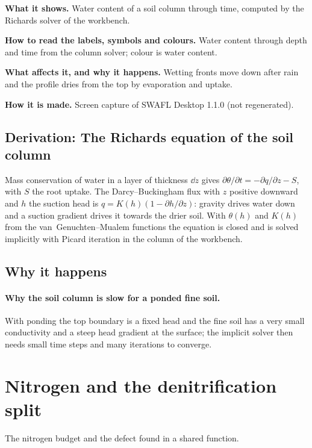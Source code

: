 \textbf{What it shows.} Water content of a soil column through time, computed by the Richards solver of the workbench.

\textbf{How to read the labels, symbols and colours.} Water content through depth and time from the column solver; colour is water content.

\textbf{What affects it, and why it happens.} Wetting fronts move down after rain and the profile dries from the top by evaporation and uptake.

\textbf{How it is made.} Screen capture of SWAFL Desktop 1.1.0 (not regenerated).


\subsection{Derivation: The Richards equation of the soil column}\label{der:s3:4}
Mass conservation of water in a layer of thickness $\dd z$ gives $\partial\theta/\partial t=-\partial q/\partial z-S$, with $S$ the root uptake. The Darcy--Buckingham flux with $z$ positive downward and $h$ the suction head is $q=K(h)(1-\partial h/\partial z)$: gravity drives water down and a suction gradient drives it towards the drier soil. With $\theta(h)$ and $K(h)$ from the van~Genuchten--Mualem functions the equation is closed and is solved implicitly with Picard iteration in the column of the workbench.


\subsection{Why it happens}
\paragraph{Why the soil column is slow for a ponded fine soil.} With ponding the top boundary is a fixed head and the fine soil has a very small conductivity and a steep head gradient at the surface; the implicit solver then needs small time steps and many iterations to converge.

\section{Nitrogen and the denitrification split}
The nitrogen budget and the defect found in a shared function.

